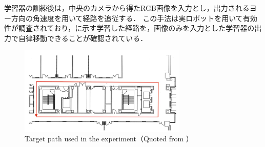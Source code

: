 学習器の訓練後は，中央のカメラから得たRGB画像を入力とし，出力されるヨー方向の角速度を用いて経路を追従する．
この手法は実ロボットを用いて有効性が調査されており，に示す学習した経路を，画像のみを入力とした学習器の出力で自律移動できることが確認されている．

\begin{figure}[htbp]
  \centering
   \includegraphics[width=80mm]{images/pdf/okada/cource.pdf}
   \caption{Target path used in the experiment（Quoted from \cite{okada2020}）}
   \label{fig:cource}
\end{figure}
